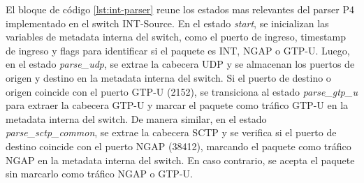El bloque de código \ref{lst:int-parser} reune los estados mas relevantes del parser P4 implementado en el switch INT-Source. En el estado \textit{start}, se inicializan las variables de metadata interna del switch, como el puerto de ingreso, timestamp de ingreso y flags para identificar si el paquete es INT, NGAP o GTP-U. Luego, en el estado \textit{parse\_udp}, se extrae la cabecera UDP y se almacenan los puertos de origen y destino en la metadata interna del switch. Si el puerto de destino o origen coincide con el puerto GTP-U (2152), se transiciona al estado \textit{parse\_gtp\_u} para extraer la cabecera GTP-U y marcar el paquete como tráfico GTP-U en la metadata interna del switch. De manera similar, en el estado \textit{parse\_sctp\_common}, se extrae la cabecera SCTP y se verifica si el puerto de destino coincide con el puerto NGAP (38412), marcando el paquete como tráfico NGAP en la metadata interna del switch. En caso contrario, se acepta el paquete sin marcarlo como tráfico NGAP o GTP-U.

